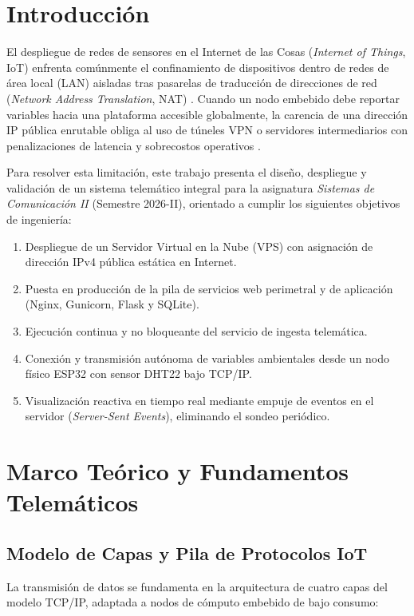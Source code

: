 \documentclass[conference]{IEEEtran}
\begin{document}
\section{Introducción}
El despliegue de redes de sensores en el Internet de las Cosas (\textit{Internet of Things}, IoT) enfrenta comúnmente el confinamiento de dispositivos dentro de redes de área local (LAN) aisladas tras pasarelas de traducción de direcciones de red (\textit{Network Address Translation}, NAT) \cite{tanenbaum2021}. Cuando un nodo embebido debe reportar variables hacia una plataforma accesible globalmente, la carencia de una dirección IP pública enrutable obliga al uso de túneles VPN o servidores intermediarios con penalizaciones de latencia y sobrecostos operativos \cite{kurose2017}.

Para resolver esta limitación, este trabajo presenta el diseño, despliegue y validación de un sistema telemático integral para la asignatura \textit{Sistemas de Comunicación II} (Semestre 2026-II), orientado a cumplir los siguientes objetivos de ingeniería:
\begin{enumerate}
    \item Despliegue de un Servidor Virtual en la Nube (VPS) con asignación de dirección IPv4 pública estática en Internet.
    \item Puesta en producción de la pila de servicios web perimetral y de aplicación (Nginx, Gunicorn, Flask y SQLite).
    \item Ejecución continua y no bloqueante del servicio de ingesta telemática.
    \item Conexión y transmisión autónoma de variables ambientales desde un nodo físico ESP32 con sensor DHT22 bajo TCP/IP.
    \item Visualización reactiva en tiempo real mediante empuje de eventos en el servidor (\textit{Server-Sent Events}), eliminando el sondeo periódico.
\end{enumerate}

\section{Marco Teórico y Fundamentos Telemáticos}

\subsection{Modelo de Capas y Pila de Protocolos IoT}
La transmisión de datos se fundamenta en la arquitectura de cuatro capas del modelo TCP/IP, adaptada a nodos de cómputo embebido de bajo consumo:
\end{document}
